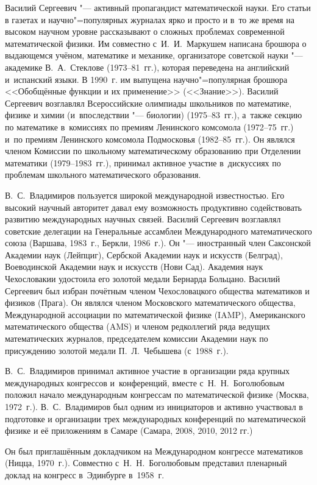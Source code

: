 Василий Сергеевич "--- активный пропагандист математической науки. 
Его статьи в газетах и научно"=популярных журналах ярко и просто и в~то же время на высоком научном уровне рассказывают о сложных проблемах современной математической физики. 
Им совместно с~И.~И.~Маркушем написана брошюра о выдающемся учёном, математике и механике, организаторе советской науки "--- академике В.~А.~Стеклове (1973--81~гг.), которая переведена на английский и~испанский языки. 
В 1990~г. им выпущена научно"=популярная брошюра <<Обобщённые функции и их применение>> (<<Знание>>). 
Василий Сергеевич возглавлял Всероссийские олимпиады школьников по математике, физике и химии (и~впоследствии "--- биологии) (1975--83~гг.), а~также секцию по математике в~комиссиях по
премиям Ленинского комсомола (1972--75~гг.) и~по премиям Ленинского комсомола Подмосковья (1982--85~гг.). 
Он являлся членом Комиссии по школьному математическому образованию при Отделении математики (1979--1983~гг.), принимал активное участие в~дискуссиях по проблемам школьного математического образования.

В.~С.~Владимиров пользуется широкой международной известностью.
Его высокий научный авторитет давал ему возможность продуктивно содействовать развитию международных научных связей. 
Василий Сергеевич возглавлял советские делегации на Генеральные ассамблеи Международного математического союза (Варшава, 1983~г., Беркли, 1986~г.).
Он "--- иностранный член Саксонской Академии наук (Лейпциг), Сербской Академии наук и искусств (Белград), Воеводинской Академии наук и искусств (Нови Сад). 
Академия наук Чехословакии удостоила его золотой медали Бернарда Больцано. 
Василий Сергеевич был избран почётным членом Чехословацкого общества математиков и физиков (Прага).
Он являлся членом Московского математического общества, Международной ассоциации по математической физике (IAMP), Американского математического общества (AMS) и членом редколлегий ряда ведущих математических журналов, председателем комиссии Академии наук по присуждению золотой медали П.~Л.~Чебышева (с~1988~г.).


В.~С.~Владимиров принимал активное участие в организации ряда крупных международных конгрессов и~конференций, вместе с~Н.~Н.~Боголюбовым положил начало международным конгрессам по математической физике (Москва, 1972~г.).
В.~С.~Владимиров был одним из инициаторов и активно участвовал в подготовке и организации трех международных конференций по математической физике и её приложениям в Самаре (Самара, 2008, 2010, 2012 гг.)

Он был приглашённым докладчиком на Международном конгрессе математиков (Ницца, 1970~г.). Совместно с~Н.~Н.~Боголюбовым представил пленарный доклад на конгресс в~Эдинбурге в~1958~г.


